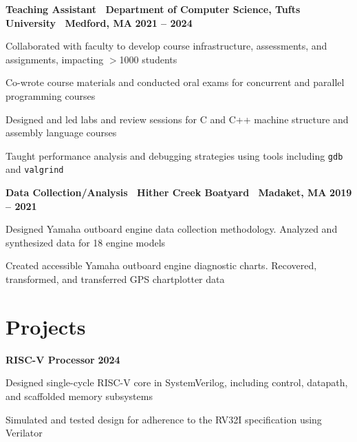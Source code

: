 \documentclass[10pt]{article}
\newenvironment{mylist}[1][]
{\itemize[nosep, wide=0pt, leftmargin=*, after=\strut]}
{\enditemize}
\begin{document}
\begin{minipage}[t]{\linewidth}
    \textbf{Teaching Assistant \textbar \ Department of Computer Science, Tufts University \textbar \ Medford, MA} \hfill \textbf{2021 -- 2024}
    \begin{mylist} 
        \item Collaborated with faculty to develop course infrastructure, assessments, and assignments, impacting $>$1000 students
        \item Co-wrote course materials and conducted oral exams for concurrent and parallel programming courses
        \item Designed and led labs and review sessions for C and C++ machine structure and assembly language courses
        \item Taught performance analysis and debugging strategies using tools including \texttt{gdb} and \texttt{valgrind}
    \end{mylist}
\end{minipage}

\begin{minipage}[t]{\linewidth}
    \textbf{Data Collection/Analysis \textbar \ Hither Creek Boatyard \textbar \ Madaket, MA} \hfill \textbf{2019 -- 2021}
    \begin{mylist}
        \item Designed Yamaha outboard engine data collection methodology. Analyzed and synthesized data for 18 engine models
        \item Created accessible Yamaha outboard engine diagnostic charts. Recovered, transformed, and transferred GPS chartplotter data
    \end{mylist}
\end{minipage}


\section{Projects}

\begin{minipage}[t]{\linewidth}
    \textbf{RISC-V Processor} \hfill \textbf{2024}
    \begin{mylist}
    \item Designed single-cycle RISC-V core in SystemVerilog, including control, datapath, and scaffolded memory subsystems
    \item Simulated and tested design for adherence to the RV32I specification using Verilator
    \end{mylist}
\end{minipage}
\end{document}
